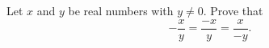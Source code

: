 Let $x$ and $y$ be real numbers with $y\ne0$. Prove that
\[
-\dfrac{x}{y}=\dfrac{-x}{y}=\dfrac{x}{-y}.
\]
